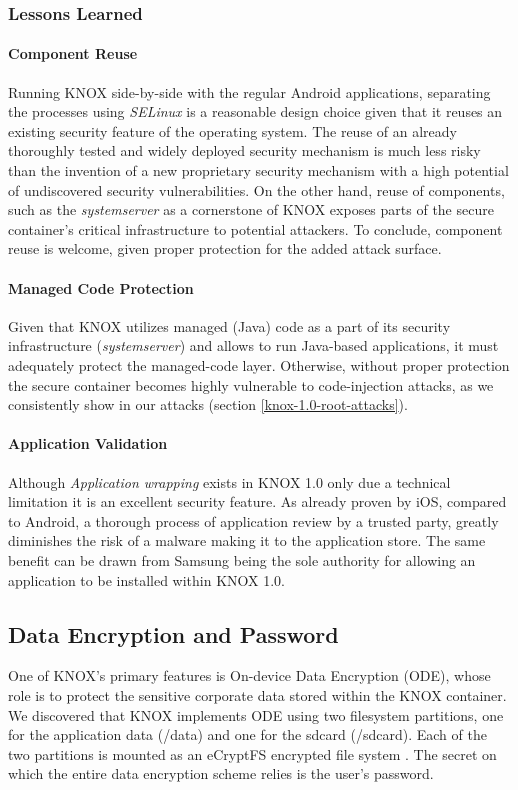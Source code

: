 \documentclass[11pt]{article}
\begin{document}
\subsubsection{Lessons Learned}
\paragraph{Component Reuse}
Running KNOX side-by-side with the regular Android applications, separating the processes using \emph{SELinux} is a reasonable design choice given that 
it reuses an existing security feature of the operating system. The reuse of an already thoroughly tested and widely deployed security mechanism is much
less risky than the invention of a new proprietary security mechanism with a high potential of undiscovered security vulnerabilities.
On the other hand, reuse of components, such as the \emph{system\textunderscore server} as a cornerstone of KNOX exposes parts of the 
secure container's critical infrastructure to potential attackers.
To conclude, component reuse is welcome, given proper protection for the added attack surface.

\paragraph{Managed Code Protection}
Given that KNOX utilizes managed (Java) code as a part of its security infrastructure (\emph{system\textunderscore server}) and allows to run 
Java-based applications, it must adequately protect the managed-code layer. 
Otherwise, without proper protection the secure container becomes highly vulnerable to code-injection attacks, as we consistently show in our attacks (section \ref{knox-1.0-root-attacks}).

\paragraph{Application Validation}
Although \emph{Application wrapping} exists in KNOX 1.0 only due a technical limitation it is an excellent security feature. As already proven by iOS, 
compared to Android, a thorough process of application review by a trusted party, greatly diminishes the risk of a malware making it to the 
application store. The same benefit can be drawn from Samsung being the sole authority for allowing an application to be installed within KNOX 1.0.

\subsection{Data Encryption and Password}
One of KNOX's primary features is On-device Data Encryption (ODE), whose role is to protect the sensitive corporate data stored within the KNOX container.
We discovered that KNOX implements ODE using two filesystem partitions, one for the application data (/data) and one for the sdcard (/sdcard).
Each of the two partitions is mounted as an eCryptFS encrypted file system \cite{eCryptFS}. The secret on which the entire data encryption scheme relies 
is the user's password.
\end{document}
